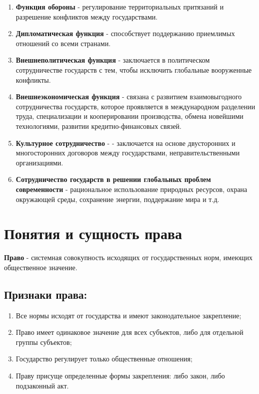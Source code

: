 \documentclass[a5paper,10pt]{article}
\begin{document}
			\begin{enumerate}
				\item \textbf{Функция обороны} - регулирование территориальных притязаний и разрешение конфликтов между государствами.

				\item \textbf{Дипломатическая функция} - способствует поддержанию приемлимых отношений со всеми странами.

				\item \textbf{Внешнеполитическая функция} - заключается в политическом сотрудничестве государств с тем, чтобы исключить глобальные вооруженные конфликты.

				\item \textbf{Внешнеэкономическая функция} - связана с развитием взаимовыгодного сотрудничества государств, которое проявляется в международном разделении труда, специализации и кооперировании производства, обмена новейшими технологиями, развитии кредитно-финансовых связей.

				\item \textbf{Культурное сотрудничество} - - заключается на основе двусторонних и многосторонних договоров между государствами, неправительственными организациями.

				\item \textbf{Сотрудничество государств в решении глобальных проблем современности} - рациональное использование природных ресурсов, охрана окружающей среды, сохранение энергии, поддержание мира и т.д.
			\end{enumerate}

	\section{Понятия и сущность права}
		\textbf{Право} - системная совокупность исходящих от государственных норм, имеющих общественное значение.

		\subsection{Признаки права:}
			\begin{enumerate}
				\item Все нормы исходят от государства и имеют законодательное закрепление;

				\item Право имеет одинаковое значение для всех субъектов, либо для отдельной группы субъектов;

				\item Государство регулирует только общественные отношения;

				\item Праву присуще определенные формы закрепления: либо закон, либо подзаконный акт.
			\end{enumerate}
\end{document}
